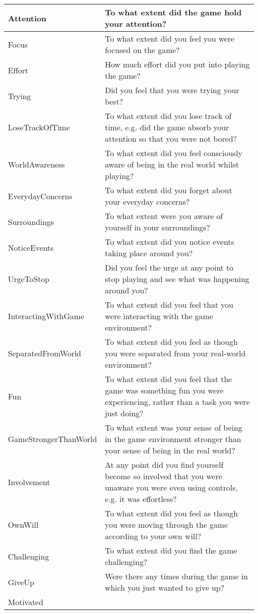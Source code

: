 \documentclass[letterpaper,10pt,english]{sphinxmanual}
\begin{document}
\begin{savenotes}
\begin{longtable}{|l|l|}
Attention
&
To what extent did the game hold your attention?
\\
\hline
Focus
&
To what extent did you feel you were focused on the game?
\\
\hline
Effort
&
How much effort did you put into playing the game?
\\
\hline
Trying
&
Did you feel that you were trying your best?
\\
\hline
LoseTrackOfTime
&
To what extent did you lose track of time, e.g. did the game absorb your attention so that you were not bored?
\\
\hline
WorldAwareness
&
To what extent did you feel consciously aware of being in the real world whilst playing?
\\
\hline
EverydayConcerns
&
To what extent did you forget about your everyday concerns?
\\
\hline
Surroundings
&
To what extent were you aware of yourself in your surroundings?
\\
\hline
NoticeEvents
&
To what extent did you notice events taking place around you?
\\
\hline
UrgeToStop
&
Did you feel the urge at any point to stop playing and see what was happening around you?
\\
\hline
InteractingWithGame
&
To what extent did you feel that you were interacting with the game environment?
\\
\hline
SeparatedFromWorld
&
To what extent did you feel as though you were separated from your real-world environment?
\\
\hline
Fun
&
To what extent did you feel that the game was something fun you were experiencing, rather than a task you were just doing?
\\
\hline
GameStrongerThanWorld
&
To what extent was your sense of being in the game environment stronger than your sense of being in the real world?
\\
\hline
Involvement
&
At any point did you find yourself become so involved that you were unaware you were even using controls, e.g. it was effortless?
\\
\hline
OwnWill
&
To what extent did you feel as though you were moving through the game according to your own will?
\\
\hline
Challenging
&
To what extent did you find the game challenging?
\\
\hline
GiveUp
&
Were there any times during the game in which you just wanted to give up?
\\
\hline
Motivated

\end{longtable}
\end{savenotes}
\end{document}
